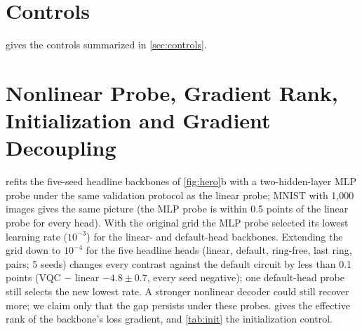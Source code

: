 \section{Controls}
\label{app:controls}



 gives the controls summarized in \cref{sec:controls}.

\section{Nonlinear Probe, Gradient Rank, Initialization and Gradient Decoupling}
\label{app:mechanism}





 refits the five-seed headline backbones of \cref{fig:hero}b with a two-hidden-layer MLP probe
under the same validation protocol as the linear probe; MNIST with 1,000 images gives the same
picture (the MLP probe is within 0.5 points of the linear probe for every head). With the
original grid the MLP probe selected its lowest learning rate ($10^{-3}$) for the linear- and
default-head backbones. Extending the grid down to $10^{-4}$ for the five headline heads (linear,
default, ring-free, last ring, pairs; 5 seeds) changes every contrast against the default
circuit by less than 0.1 points (VQC $-$ linear $-4.8\pm0.7$, every seed negative); one
default-head probe still selects the new lowest rate. A stronger nonlinear decoder could still
recover more; we claim only that the gap persists under these probes.  gives the
effective rank of the backbone's loss gradient, and \cref{tab:init} the initialization control.


